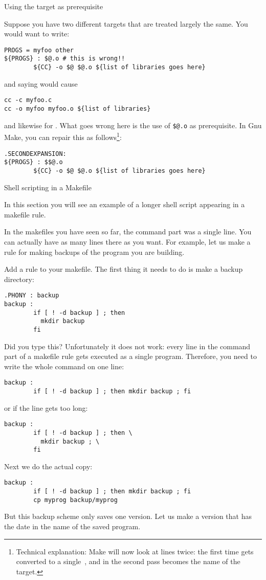  {Using the target as prerequisite}

Suppose you have two different targets that are treated largely the
same. You would want to write:
\begin{verbatim}
PROGS = myfoo other
${PROGS} : $@.o # this is wrong!!
        ${CC} -o $@ $@.o ${list of libraries goes here}
\end{verbatim}
and saying  would cause 
\begin{verbatim}
cc -c myfoo.c
cc -o myfoo myfoo.o ${list of libraries}
\end{verbatim}
and likewise for . What goes wrong here is the use of
\verb+$@.o+ as prerequisite. In Gnu Make, you can repair this as
follows\footnote{Technical explanation: Make will now look at lines
  twice: the first time \n{\$\$} gets converted to a single~\n{\$},
  and in the second pass  becomes the name of the target.}:
\begin{verbatim}
.SECONDEXPANSION:
${PROGS} : $$@.o
        ${CC} -o $@ $@.o ${list of libraries goes here}
\end{verbatim}


 {Shell scripting in a Makefile}

\begin{purpose}
  In this section you will see an example of a longer shell script
  appearing in a makefile rule.
\end{purpose}

In the makefiles you have seen so far, the command part was a single
line. You can actually have as many lines there as you want.
For example, let us make a rule for making backups of the program you
are building.

Add a   rule to your makefile. The first thing it needs to
do is make a backup directory:
\begin{verbatim}
.PHONY : backup
backup :
        if [ ! -d backup ] ; then 
          mkdir backup
        fi
\end{verbatim}
Did you type this? Unfortunately it does not work: every line in the
command part of a makefile rule gets executed as a single
program. Therefore, you need to write the whole command on one line:
\begin{verbatim}
backup :
        if [ ! -d backup ] ; then mkdir backup ; fi
\end{verbatim}
or if the line gets too long:
\begin{verbatim}
backup :
        if [ ! -d backup ] ; then \
          mkdir backup ; \
        fi
\end{verbatim}
Next we do the actual copy:
\begin{verbatim}
backup :
        if [ ! -d backup ] ; then mkdir backup ; fi
        cp myprog backup/myprog
\end{verbatim}
But this backup scheme only saves one version. Let us make a version
that has the date in the name of the saved program. 

